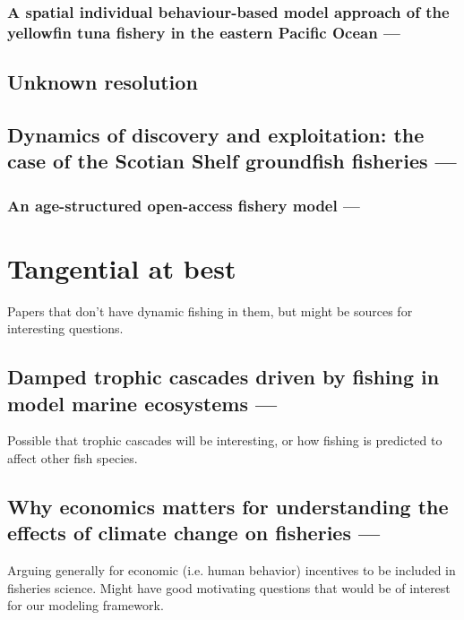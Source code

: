 \documentclass[12pt, a4paper]{article}
\begin{document}
\subsubsection{A spatial individual behaviour-based model approach of the yellowfin tuna fishery in the eastern Pacific Ocean --- \cite{DreyfusLeonKleiber2001}}


\subsection{Unknown resolution}

\subsection{Dynamics of discovery and exploitation: the case of the Scotian Shelf groundfish fisheries --- \cite{AllenMcGlade1986}}

\subsubsection{An age-structured open-access fishery model --- \cite{McGarvey1994}}





\section{Tangential at best}

Papers that don't have dynamic fishing in them, but might be sources for interesting questions. 

\subsection{Damped trophic cascades driven by fishing in model marine ecosystems --- \cite{AndersonPedersen2010}}
Possible that trophic cascades will be interesting, or how fishing is predicted to affect other fish species. 

\subsection{Why economics matters for understanding the effects of climate change on fisheries --- \cite{HayniePfeiffer2012}}
Arguing generally for economic (i.e. human behavior) incentives to be included in fisheries science. Might have good motivating questions that would be of interest for our modeling framework. 
\end{document}
